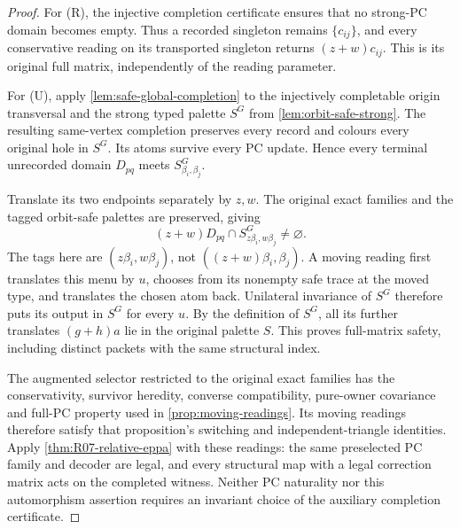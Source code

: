 \begin{proof}
For (R), the injective completion certificate ensures that no
strong-PC domain becomes empty. Thus a recorded singleton remains
$\{c_{ij}\}$, and every conservative reading on its transported
singleton returns $(z+w)c_{ij}$. This is its original full matrix,
independently of the reading parameter.

For (U), apply \cref{lem:safe-global-completion} to the injectively
completable origin transversal and the strong typed palette $S^G$
from \cref{lem:orbit-safe-strong}. The resulting same-vertex
completion preserves every record and colours every original hole
in $S^G$. Its atoms survive every PC update. Hence every terminal
unrecorded domain $D_{pq}$ meets $S^G_{\beta_i,\beta_j}$.

Translate its two endpoints separately by $z,w$. The original exact
families and the tagged orbit-safe palettes are preserved, giving
\[
 (z+w)D_{pq}\cap S^G_{z\beta_i,w\beta_j}\ne\varnothing.
\]
The tags here are $(z\beta_i,w\beta_j)$, not
$((z+w)\beta_i,\beta_j)$. A moving reading first translates this
menu by $u$, chooses from its nonempty safe trace at the moved
type, and translates the chosen atom back. Unilateral invariance
of $S^G$ therefore puts its output in $S^G$ for every $u$.
By the definition of $S^G$, all its further translates $(g+h)a$
lie in the original palette $S$. This proves full-matrix safety,
including distinct packets with the same structural index.

The augmented selector restricted to the original exact families
has the conservativity, survivor heredity, converse compatibility,
pure-owner covariance and full-PC property used in
\cref{prop:moving-readings}. Its moving readings therefore satisfy
that proposition's switching and independent-triangle identities.
Apply \cref{thm:R07-relative-eppa} with these readings: the same
preselected PC family and decoder are legal, and every structural
map with a legal correction matrix acts on the completed witness.
Neither PC naturality nor this automorphism assertion requires an
invariant choice of the auxiliary completion certificate.
\end{proof}

